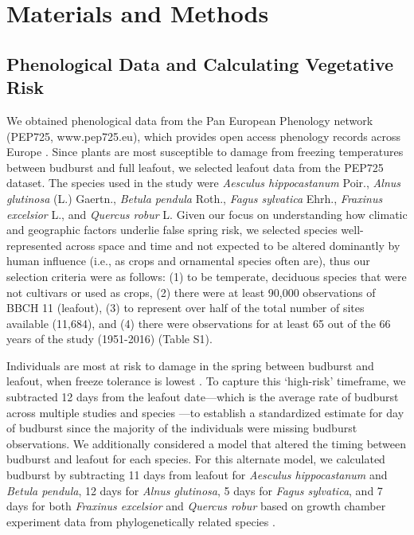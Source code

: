 \documentclass{article}\usepackage[]{graphicx}\usepackage[]{color}
\begin{document}
\section*{Materials and Methods} %
\subsection*{Phenological Data and Calculating Vegetative Risk}
We obtained phenological data from the Pan European Phenology network (PEP725, www.pep725.eu), which provides open access phenology records across Europe \citep{Templ2018}. Since plants are most susceptible to damage from freezing temperatures between budburst and full leafout, we selected leafout data \citep[i.e., in][BBCH 11, which is defined as the point of leaf unfolding and the first visible leaf stalk]{Meier2001} from the PEP725 dataset. The species used in the study were \textit{Aesculus hippocastanum} Poir., \textit{Alnus glutinosa} (L.) Gaertn., \textit{Betula pendula} Roth., \textit{Fagus sylvatica} Ehrh., \textit{Fraxinus excelsior} L., and \textit{Quercus robur} L. Given our focus on understanding how climatic and geographic factors underlie false spring risk, we selected species well-represented across space and time and not expected to be altered dominantly by human influence (i.e., as crops and ornamental species often are), thus our selection criteria were as follows: (1) to be temperate, deciduous species that were not cultivars or used as crops, (2) there were at least 90,000 observations of BBCH 11 (leafout), (3) to represent over half of the total number of sites available (11,684), and (4) there were observations for at least 65 out of the 66 years of the study (1951-2016) (Table S1). 

Individuals are most at risk to damage in the spring between budburst and leafout, when freeze tolerance is lowest \citep{Sakai1987}. To capture this `high-risk' timeframe, we subtracted 12 days from the leafout date---which is the average rate of budburst across multiple studies and species \citep{Donnelly2017,Flynn2018,NPN2019}---to establish a standardized estimate for day of budburst since the majority of the individuals were missing budburst observations. 
We additionally considered a model that altered the timing between budburst and leafout for each species. For this alternate model, we calculated budburst by subtracting 11 days from leafout for \textit{Aesculus hippocastanum} and \textit{Betula pendula}, 12 days for \textit{Alnus glutinosa}, 5 days for \textit{Fagus sylvatica}, and 7 days for both \textit{Fraxinus excelsior} and \textit{Quercus robur} based on growth chamber experiment data from phylogenetically related species \citep{Buerki2010,Wang2016,  Hipp2017,Flynn2018}.
\end{document}
